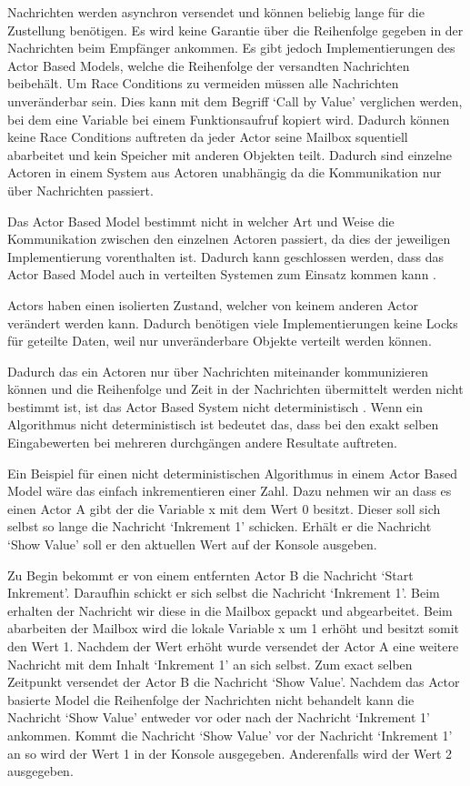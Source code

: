 Nachrichten werden asynchron versendet und können beliebig lange für die Zustellung benötigen. Es wird keine Garantie über die Reihenfolge gegeben in der Nachrichten beim Empfänger ankommen. Es gibt jedoch Implementierungen des Actor Based Models, welche die Reihenfolge der versandten Nachrichten beibehält. Um Race Conditions zu vermeiden müssen alle Nachrichten unveränderbar sein. Dies kann mit dem Begriff `Call by Value' verglichen werden, bei dem eine Variable bei einem Funktionsaufruf kopiert wird. Dadurch können keine Race Conditions auftreten da jeder Actor seine Mailbox squentiell abarbeitet und kein Speicher mit anderen Objekten teilt. Dadurch sind einzelne Actoren in einem System aus Actoren unabhängig da die Kommunikation nur über Nachrichten passiert. \cite[]{Erb2012}

Das Actor Based Model bestimmt nicht in welcher Art und Weise die Kommunikation zwischen den einzelnen Actoren passiert, da dies der jeweiligen Implementierung vorenthalten ist. Dadurch kann geschlossen werden, dass das Actor Based Model auch in verteilten Systemen zum Einsatz kommen kann \cite[]{Erb2012}.

Actors haben einen isolierten Zustand, welcher von keinem anderen Actor verändert werden kann. Dadurch benötigen viele Implementierungen keine Locks für geteilte Daten, weil nur unveränderbare Objekte verteilt werden können. 

Dadurch das ein Actoren nur über Nachrichten miteinander kommunizieren können und die Reihenfolge und Zeit in der Nachrichten übermittelt werden nicht bestimmt ist, ist das Actor Based System nicht deterministisch \cite[]{Agh85}. Wenn ein Algorithmus nicht deterministisch ist bedeutet das, dass bei den exakt selben Eingabewerten bei mehreren durchgängen andere Resultate auftreten.

Ein Beispiel für einen nicht deterministischen Algorithmus in einem Actor Based Model wäre das einfach inkrementieren einer Zahl. Dazu nehmen wir an dass es einen Actor A gibt der die Variable x mit dem Wert 0 besitzt. Dieser soll sich selbst so lange die Nachricht `Inkrement 1' schicken. Erhält er die Nachricht `Show Value' soll er den aktuellen Wert auf der Konsole ausgeben.

Zu Begin bekommt er von einem entfernten Actor B die Nachricht `Start Inkrement'. Daraufhin schickt er sich selbst die Nachricht `Inkrement 1'. Beim erhalten der Nachricht wir diese in die Mailbox gepackt und abgearbeitet. Beim abarbeiten der Mailbox wird die lokale Variable x um 1 erhöht und besitzt somit den Wert 1. Nachdem der Wert erhöht wurde versendet der Actor A eine weitere Nachricht mit dem Inhalt `Inkrement 1' an sich selbst. Zum exact selben Zeitpunkt versendet der Actor B die Nachricht `Show Value'. Nachdem das Actor basierte Model die Reihenfolge der Nachrichten nicht behandelt kann die Nachricht `Show Value' entweder vor oder nach der Nachricht `Inkrement 1' ankommen. Kommt die Nachricht `Show Value' vor der Nachricht `Inkrement 1' an so wird der Wert 1 in der Konsole ausgegeben. Anderenfalls wird der Wert 2 ausgegeben.

